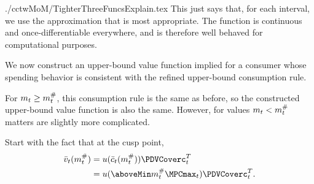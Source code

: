 \documentclass[SolvingMicroDSOPs]{subfiles}
\begin{document}
\begin{verbatimwrite}{./cctwMoM/TighterThreeFuncsExplain.tex}
  This just says that, for each interval, we use the approximation that
  is most appropriate.  The function is continuous and
  once-differentiable everywhere, and is therefore well behaved for
  computational purposes.
  \begin{comment}
    In practice, in our problem the difference due to this refinement is displayed in Figure \ref{fig:IntExpFOCInvPesReaOpt45GapPlot}.
    \hypertarget{IntExpFOCInvPesReaOpt45GapPlot}{}
    \begin{figure}
      \texttt{[image: ./Figures/IntExpFOCInvPesReaOpt45GapPlot]}
      \caption{Difference Between $\Aprx{\Max{\cFunc}}_{L, T-1}$ and $\Aprx{\Max{\cFunc}}_{H,T-1}$ is Small}
      \label{fig:IntExpFOCInvPesReaOpt45GapPlot}
    \end{figure}
  \end{comment}

  We now construct an upper-bound value function implied for a consumer whose spending behavior is consistent with the refined upper-bound consumption rule.

  For $m_{t} \geq m_{t}^{\#}$, this consumption rule is the same as before,
  so the constructed upper-bound value function is also the same.  However, for
  values $m_{t} < m_{t}^{\#}$ matters are slightly more complicated.

  Start with the fact that at the cusp point,
  \begin{equation*}\begin{gathered}\begin{aligned}
        \bar{\vFunc}_{\prd}(\mtCusp)  & = \uFunc(\bar{\cNrm}_{\prd}(\mtCusp))\PDVCoverc_{\prd}^T \\
        & =  \uFunc(\aboveMin \mtCusp  \MPCmax_{\prd})\PDVCoverc_{\prd}^{T}
        .
      \end{aligned}\end{gathered}\end{equation*}


\end{verbatimwrite}
\end{document}
